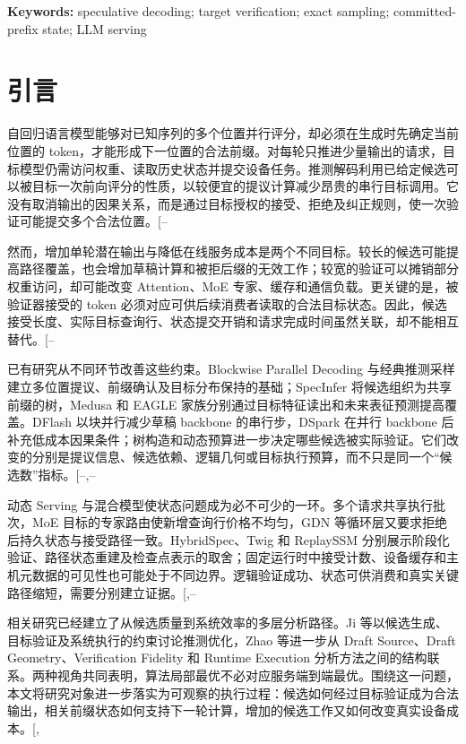 \documentclass[
  a4paper,
  UTF8,
  fontset=none,
  zihao=5]{ctexart}
\begin{document}
\textbf{Keywords:} speculative decoding; target verification; exact
sampling; committed-prefix state; LLM serving

\section{引言}\label{introduction}

自回归语言模型能够对已知序列的多个位置并行评分，却必须在生成时先确定当前位置的
token，才能形成下一位置的合法前缀。对每轮只推进少量输出的请求，目标模型仍需访问权重、读取历史状态并提交设备任务。推测解码利用已给定候选可以被目标一次前向评分的性质，以较便宜的提议计算减少昂贵的串行目标调用。它没有取消输出的因果关系，而是通过目标授权的接受、拒绝及纠正规则，使一次验证可能提交多个合法位置。{[}--\citeproc{ref-chen}{3}{]}

然而，增加单轮潜在输出与降低在线服务成本是两个不同目标。较长的候选可能提高路径覆盖，也会增加草稿计算和被拒后缀的无效工作；较宽的验证可以摊销部分权重访问，却可能改变
Attention、MoE 专家、缓存和通信负载。更关键的是，被验证器接受的 token
必须对应可供后续消费者读取的合法目标状态。因此，候选接受长度、实际目标查询行、状态提交开销和请求完成时间虽然关联，却不能相互替代。{[}--\citeproc{ref-hybridspec}{7}{]}

已有研究从不同环节改善这些约束。Blockwise Parallel Decoding
与经典推测采样建立多位置提议、前缀确认及目标分布保持的基础；SpecInfer
将候选组织为共享前缀的树，Medusa 和 EAGLE
家族分别通过目标特征读出和未来表征预测提高覆盖。DFlash 以块并行减少草稿
backbone 的串行步，DSpark 在并行 backbone
后补充低成本因果条件；树构造和动态预算进一步决定哪些候选被实际验证。它们改变的分别是提议信息、候选依赖、逻辑几何或目标执行预算，而不只是同一个``候选数''指标。{[}--,--\citeproc{ref-dspark}{13}{]}

动态 Serving
与混合模型使状态问题成为必不可少的一环。多个请求共享执行批次，MoE
目标的专家路由使新增查询行价格不均匀，GDN
等循环层又要求拒绝后持久状态与接受路径一致。HybridSpec、Twig 和
ReplaySSM
分别展示阶段化验证、路径状态重建及检查点表示的取舍；固定运行时中接受计数、设备缓存和主机元数据的可见性也可能处于不同边界。逻辑验证成功、状态可供消费和真实关键路径缩短，需要分别建立证据。{[},--\citeproc{ref-ascend-pin}{17}{]}

相关研究已经建立了从候选质量到系统效率的多层分析路径。Ji
等以候选生成、目标验证及系统执行的约束讨论推测优化，Zhao 等进一步从
Draft Source、Draft Geometry、Verification Fidelity 和 Runtime Execution
分析方法之间的结构联系。两种视角共同表明，算法局部最优不必对应服务端到端最优。围绕这一问题，本文将研究对象进一步落实为可观察的执行过程：候选如何经过目标验证成为合法输出，相关前缀状态如何支持下一轮计算，增加的候选工作又如何改变真实设备成本。{[},\citeproc{ref-zhao2026survey}{19}{]}
\end{document}

